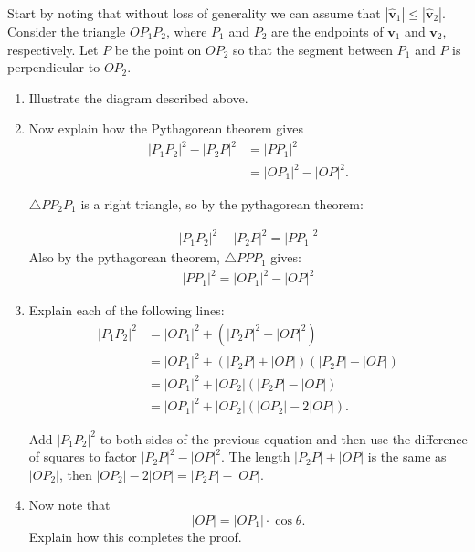 \documentclass[newpage,hints,handout,nooutcomes,noauthor,12pt]{ximera}
\begin{document}
\begin{problem}
Start by noting that without loss of generality we can assume that
$\left\lvert \hat{\mathbf v} _{1}\right\rvert
\le \left\vert \hat{\mathbf v}_{2}\right\rvert$.
Consider the triangle $OP_1P_2$, where $P_1$ and $P_2$ are the endpoints of
$\mathbf{v}_1$ and $\mathbf{v}_2$, respectively.  Let $P$ be the point on
$OP_2$ so that the segment between $P_{1}$ and $P$ is perpendicular to $OP_2$.
\begin{enumerate}
\item Illustrate the diagram described above.


\item Now explain how the Pythagorean theorem gives
\begin{align*}
|P_{1}P_{2}|^{2}-|P_{2}P|^{2} &= |PP_{1}|^{2}\\
&= |OP_{1}|^{2}-|OP|^{2}.
\end{align*}

\begin{freeResponse}
$\triangle PP_{2}P_{1}$ is a right triangle, so by the pythagorean theorem:

\begin{align*}
|P_{1}P_{2}|^{2} - |P_{2}P|^{2} = |PP_{1}|^{2}
\end{align*}
Also by the pythagorean theorem, $ \triangle PPP_{1}$ gives:
\begin{align*}  |PP_{1}|^{2} = |OP_{1}|^{2} - |OP|^{2}
\end{align*}

\end{freeResponse}

\item Explain each of the following lines:
\begin{align}
|P_{1}P_{2}|^{2} &= |OP_{1}|^{2}+\left(|P_{2}P|^{2}-|OP|^{2}\right) \\
&=|OP_{1}|^{2}+\left(|P_{2}P|+|OP|\right)\left(|P_{2}P|-|OP| \right) \\
&=|OP_{1}|^{2}+|OP_{2}| \left(|P_{2}P|-|OP|\right)\\
&=|OP_{1}|^{2}+|OP_{2}| \left(|OP_{2}| -2| OP| \right).
\end{align}

\begin{freeResponse}
Add $|P_{1}P_{2}|^2$ to both sides of the previous equation and then use the difference of squares to factor $|P_{2}P|^{2}- |OP|^2$.
The length $|P_{2}P|+|OP|$ is the same as $|OP_{2}|$, then $|OP_{2}| - 2|OP| = |P_{2}P|-|OP|$.
\end{freeResponse}
\item Now note that
\[
|OP| =|OP_{1}| \cdot\cos\theta.
\]
Explain how this completes the proof.


\end{enumerate}
\end{problem}
\end{document}
